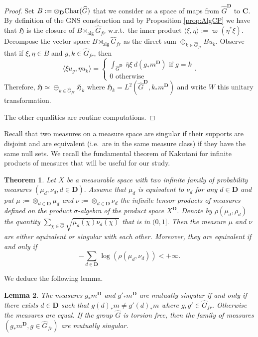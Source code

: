 \documentclass[a4paper,12pt]{amsart}
\numberwithin{equation}{section}
\newtheorem{theo}{Theorem}[section]
\newtheorem{lemma}[theo]{Lemma}
\theoremstyle{definition}
\DeclareMathOperator{\alg}{alg}
\newcommand{\C}{\mathbf C}
\newcommand{\Ch}{\textup{Char}}
\newcommand{\D}{\mathbf D}
\newcommand{\fH}{\mathfrak H}
\newcommand{\ot}{\otimes}\newcommand{\otmin}{\otimes_{\text{min}}}
\newcommand{\wh}{\widehat}
\begin{document}
\begin{proof}
Set $B:=\ot_\D \Ch(\wh G)$ that we consider as a space of maps from ${\wh G}^\D$ to $\C$.
By definition of the GNS construction and by Proposition \ref{prop:AlgCP} we have that $\fH$ is the closure of $B\rtimes_{\alg} \wh G_{fr}$ w.r.t.~the inner product $\langle \xi,\eta\rangle := \varpi(\eta^*\xi)$.
Decompose the vector space $B\rtimes_{\alg} \wh G_{fr}$ as the direct sum $\oplus_{k\in\wh G_{fr}} B u_k$.
Observe that if $\xi,\eta\in B$ and $g,k\in \wh G_{fr}$, then 
$$\langle \xi u_g , \eta u_k \rangle = \begin{cases} \int_{{\wh G}^\D } \ \overline\eta \xi \ d( g_* m^\D) \text{ if } g=k\\ 0 \text{ otherwise } \end{cases} .$$
Therefore, $\fH\simeq\oplus_{k\in \wh G_{fr}} \fH_k$ where $\fH_k=L^2({\wh G}^\D, k_*m^\D)$ and write $W$ this unitary transformation.

The other equalities are routine computations.
\end{proof}

Recall that two measures on a measure space are singular if their supports are disjoint and are equivalent (i.e.~are in the same measure class)  if they have the same null sets.
We recall the fundamental theorem of Kakutani for infinite products of measures that will be useful for our study. 

\begin{theo}\label{theo:Kakutani}\cite{Kakutani48}
Let $X$ be a measurable space with two infinite family of probability measures $(\mu_d, \nu_d, d\in\D).$
Assume that $\mu_d$ is equivalent to $\nu_d$ for any $d\in\D$ and put $\mu:=\ot_{d\in\D} \mu_d$ and $\nu:=\ot_{d\in\D} \nu_d$ the infinite tensor products of measures defined on the product $\sigma$-algebra of the product space $X^\D.$
Denote by $\rho(\mu_d,\rho_d)$ the quantity $\sum_{\chi\in\wh G} \sqrt{\mu_d(\chi) \nu_d(\chi)}$ that is in $(0,1].$
Then the measure $\mu$ and $\nu$ are either equivalent or singular with each other.
Moreover, they are equivalent if and only if 
$$ - \sum_{d\in\D} \log(\rho(\mu_d,\nu_d)) <+\infty.$$
\end{theo}

We deduce the following lemma.
\begin{lemma}\label{lem:Kakutani}
The measures $g_* m^\D$ and $g'_* m^\D$ are mutually singular if and only if there exists $d\in \D$ such that $g(d)_* m \neq g'(d)_* m$ where $g,g'\in\wh G_{fr}.$
Otherwise the measures are equal.
If the group $\wh G$ is torsion free, then the family of measures $(g_*m^\D, g\in\wh G_{fr})$ are mutually singular.
\end{lemma}
\end{document}

